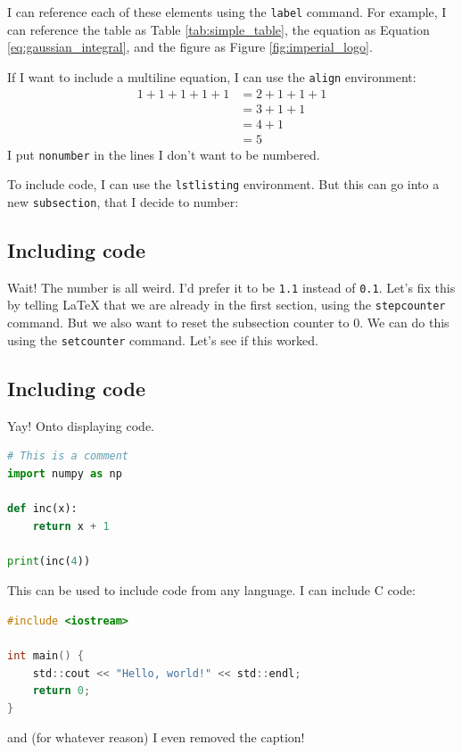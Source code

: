 \documentclass[12pt,twoside]{article}
\begin{document}
I can reference each of these elements using the \texttt{label} command. For
example, I can reference the table as Table \ref{tab:simple_table}, the equation
as Equation \ref{eq:gaussian_integral}, and the figure as Figure
\ref{fig:imperial_logo}.

If I want to include a multiline equation, I can use the \texttt{align} 
environment:
\begin{align}
    1+1+1+1+1&=2+1+1+1 \nonumber\\
    &=3+1+1 \\
    &=4+1 \nonumber\\
    &=5
\end{align}
I put \texttt{nonumber} in the lines I don't want to be numbered.

To include code, I can use the \texttt{lstlisting} environment. But this can
go into a new \texttt{subsection}, that I decide to number:

\subsection{Including code}

Wait! The number is all weird. I'd prefer it to be \texttt{1.1} instead of
\texttt{0.1}. Let's fix this by telling LaTeX that we are already in the first
section, using the \texttt{stepcounter} command.
But we also want to reset the subsection counter to 0. We can do this using the
\texttt{setcounter} command.
\setcounter{subsection}{0}
Let's see if this worked.

\subsection{Including code}

Yay! Onto displaying code.

\begin{lstlisting}[language=Python, caption=Python example]
# This is a comment
import numpy as np

def inc(x):
    return x + 1

print(inc(4))
\end{lstlisting}
This can be used to include code from any language. I can include C code:
\begin{lstlisting}[language=C]
#include <iostream>

int main() {
    std::cout << "Hello, world!" << std::endl;
    return 0;
}
\end{lstlisting}
and (for whatever reason) I even removed the caption!
\end{document}
